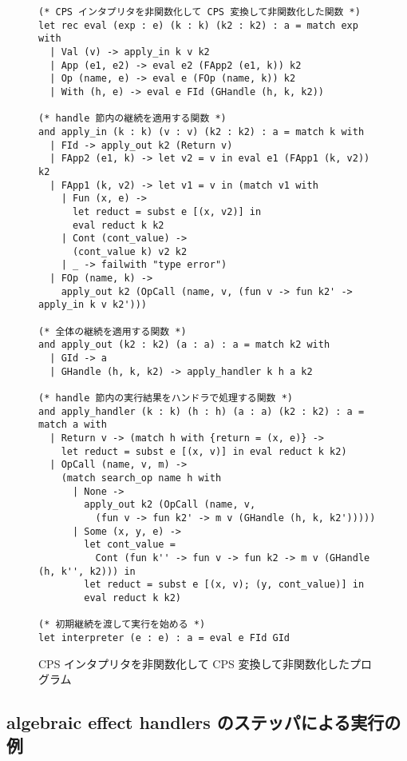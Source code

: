 \begin{figure}
\begin{spacing}{0.9}
\begin{verbatim}
(* CPS インタプリタを非関数化して CPS 変換して非関数化した関数 *)
let rec eval (exp : e) (k : k) (k2 : k2) : a = match exp with
  | Val (v) -> apply_in k v k2
  | App (e1, e2) -> eval e2 (FApp2 (e1, k)) k2
  | Op (name, e) -> eval e (FOp (name, k)) k2
  | With (h, e) -> eval e FId (GHandle (h, k, k2))

(* handle 節内の継続を適用する関数 *)
and apply_in (k : k) (v : v) (k2 : k2) : a = match k with
  | FId -> apply_out k2 (Return v)
  | FApp2 (e1, k) -> let v2 = v in eval e1 (FApp1 (k, v2)) k2
  | FApp1 (k, v2) -> let v1 = v in (match v1 with
    | Fun (x, e) ->
      let reduct = subst e [(x, v2)] in
      eval reduct k k2
    | Cont (cont_value) ->
      (cont_value k) v2 k2
    | _ -> failwith "type error")
  | FOp (name, k) ->
    apply_out k2 (OpCall (name, v, (fun v -> fun k2' -> apply_in k v k2')))

(* 全体の継続を適用する関数 *)
and apply_out (k2 : k2) (a : a) : a = match k2 with
  | GId -> a
  | GHandle (h, k, k2) -> apply_handler k h a k2

(* handle 節内の実行結果をハンドラで処理する関数 *)
and apply_handler (k : k) (h : h) (a : a) (k2 : k2) : a = match a with
  | Return v -> (match h with {return = (x, e)} ->
    let reduct = subst e [(x, v)] in eval reduct k k2)
  | OpCall (name, v, m) ->
    (match search_op name h with
      | None ->
        apply_out k2 (OpCall (name, v,
          (fun v -> fun k2' -> m v (GHandle (h, k, k2')))))
      | Some (x, y, e) ->
        let cont_value =
          Cont (fun k'' -> fun v -> fun k2 -> m v (GHandle (h, k'', k2))) in
        let reduct = subst e [(x, v); (y, cont_value)] in
        eval reduct k k2)

(* 初期継続を渡して実行を始める *)
let interpreter (e : e) : a = eval e FId GId
\end{verbatim}
\caption{CPS インタプリタを非関数化して CPS 変換して非関数化したプログラム}
\label{figure:4defun}
\end{spacing}
\end{figure}

\newpage
\subsection{algebraic effect handlers のステッパによる実行の例}
\label{subsection:step_example}

